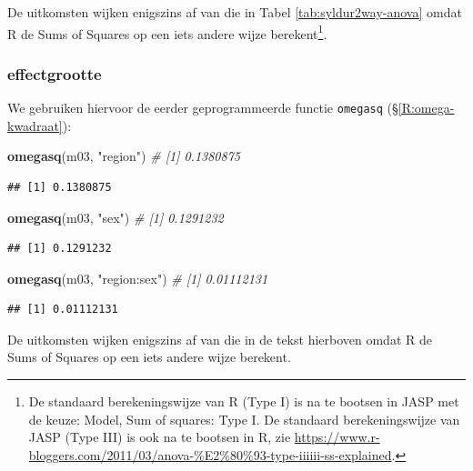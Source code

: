\documentclass[
]{book}
\newenvironment{Shaded}{\begin{snugshade}}{\end{snugshade}}
\newcommand{\CommentTok}[1]{\textcolor[rgb]{0.56,0.35,0.01}{\textit{#1}}}
\newcommand{\KeywordTok}[1]{\textcolor[rgb]{0.13,0.29,0.53}{\textbf{#1}}}
\newcommand{\NormalTok}[1]{#1}
\newcommand{\StringTok}[1]{\textcolor[rgb]{0.31,0.60,0.02}{#1}}
\begin{document}
De uitkomsten wijken enigszins af van die in Tabel \ref{tab:syldur2way-anova} omdat R de Sums of Squares op een iets andere wijze berekent\footnote{De standaard berekeningswijze van R (Type I) is na te bootsen in JASP met de keuze: Model, Sum of squares: Type I. De standaard berekeningswijze van JASP (Type III) is ook na te bootsen in R, zie \url{https://www.r-bloggers.com/2011/03/anova-\%E2\%80\%93-type-iiiiii-ss-explained}.}.

\hypertarget{effectgrootte}{%
\subsubsection{effectgrootte}\label{effectgrootte}}

We gebruiken hiervoor de eerder geprogrammeerde functie \texttt{omegasq} (§\ref{R:omega-kwadraat}):

\begin{Shaded}
\begin{Highlighting}[]
\KeywordTok{omegasq}\NormalTok{(m03, }\StringTok{"region"}\NormalTok{)      }\CommentTok{\# [1] 0.1380875}
\end{Highlighting}
\end{Shaded}

\begin{verbatim}
## [1] 0.1380875
\end{verbatim}

\begin{Shaded}
\begin{Highlighting}[]
\KeywordTok{omegasq}\NormalTok{(m03, }\StringTok{"sex"}\NormalTok{)         }\CommentTok{\# [1] 0.1291232}
\end{Highlighting}
\end{Shaded}

\begin{verbatim}
## [1] 0.1291232
\end{verbatim}

\begin{Shaded}
\begin{Highlighting}[]
\KeywordTok{omegasq}\NormalTok{(m03, }\StringTok{"region:sex"}\NormalTok{)  }\CommentTok{\# [1] 0.01112131}
\end{Highlighting}
\end{Shaded}

\begin{verbatim}
## [1] 0.01112131
\end{verbatim}

De uitkomsten wijken enigszins af van die in de tekst hierboven omdat R de Sums of Squares op een iets andere wijze berekent.
\end{document}

